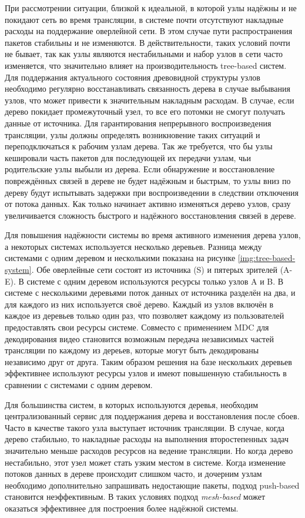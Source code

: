 		При рассмотрении ситуации, близкой к идеальной, в которой узлы надёжны и не покидают сеть во время трансляции,
		в системе почти отсутствуют накладные расходы на поддержание оверлейной сети. В этом случае пути распространения
		пакетов стабильны и не изменяются. В действительности, таких условий почти не бывает, так как узлы являются
		нестабильными и набор узлов в сети часто изменяется, что значительно влияет на производительность tree-based
		систем. Для поддержания актуального состояния древовидной структуры узлов необходимо регулярно восстанавливать
		связанность дерева в случае выбывания узлов, что может привести к значительным накладным расходам. В случае,
		если дерево покидает промежуточный узел, то все его потомки не смогут получать данные от источника. Для
		гарантирования непрерывного воспроизведения трансляции, узлы должны определять возникновение таких ситуаций и
		переподключаться к рабочим узлам дерева. Так же требуется, что бы узлы кешировали часть пакетов для последующей
		их передачи узлам, чьи родительские узлы выбыли из дерева. Если обнаружение и восстановление повреждённых связей
		в дереве не будет надёжным и быстрым, то узлы вниз по дереву будут испытывать задержки при воспроизведении в
		следствии отключения от потока данных. Как только начинает активно изменяться дерево узлов, сразу увеличивается
		сложность быстрого и надёжного восстановления связей в дереве.

		Для повышения надёжности системы во время активного изменения дерева узлов, а некоторых системах используется
		несколько деревьев. Разница между системами с одним деревом и несколькими показана на рисунке
		\ref{img:tree-based-system}. Обе оверлейные сети состоят из источника (S) и пятерых зрителей (A-E). В системе с
		одним деревом используются ресурсы только узлов A и B. В системе с несколькими деревьями поток данных от
		источника разделён на два, и для каждого из них используется своё дерево. Каждый из узлов включён в каждое из
		деревьев только один раз, что позволяет каждому из пользователей предоставлять свои ресурсы системе. Совместо с
		применением MDC для декодирования видео становится возможным передача независимых частей трансляции по каждому
		из дереьев, которые могут быть декодированы независимо друг от друга. Таким образом решения на базе нескольких
		деревьев эффективнее используют ресурсы узлов и имеют повышенную стабильность в сравнении с системами с одним
		деревом.

		Для большинства систем, в которых используются деревья, необходим централизованный сервис для поддержания дерева
		и восстановления после сбоев. Часто в качестве такого узла выступает источник трансляции. В случае, когда дерево
		стабильно, то накладные расходы на выполнения второстепенных задач значительно меньше расходов ресурсов на
		ведение трансляции. Но когда дерево нестабильно, этот узел может стать узким местом в системе. Когда изменение
		потоков данных в дереве происходит слишком часто, и дочерним узлам необходимо дополнительно запрашивать
		недостающие пакеты, подход push-based становится неэффективным. В таких условиях подход \textit{mesh-based}
		может оказаться эффективнее для построения более надёжной системы.

